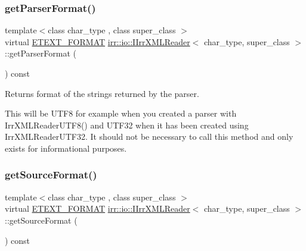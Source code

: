 \subsubsection{\texorpdfstring{get\+Parser\+Format()}{getParserFormat()}\hspace{0.1cm}{\footnotesize\ttfamily [2/2]}}
{\footnotesize\ttfamily template$<$class char\+\_\+type , class super\+\_\+class $>$ \\
virtual \hyperlink{namespaceirr_1_1io_ac7e51e5a6bd00451dec248f497b16a9d}{E\+T\+E\+X\+T\+\_\+\+F\+O\+R\+M\+AT} \hyperlink{classirr_1_1io_1_1IIrrXMLReader}{irr\+::io\+::\+I\+Irr\+X\+M\+L\+Reader}$<$ char\+\_\+type, super\+\_\+class $>$\+::get\+Parser\+Format (\begin{DoxyParamCaption}{ }\end{DoxyParamCaption}) const\hspace{0.3cm}{\ttfamily [pure virtual]}}



Returns format of the strings returned by the parser. 

This will be U\+T\+F8 for example when you created a parser with Irr\+X\+M\+L\+Reader\+U\+T\+F8() and U\+T\+F32 when it has been created using Irr\+X\+M\+L\+Reader\+U\+T\+F32. It should not be necessary to call this method and only exists for informational purposes. \mbox{\label{classirr_1_1io_1_1IIrrXMLReader_a00998ef2d3a562d6b2b8302c3430322d}} 
\subsubsection{\texorpdfstring{get\+Source\+Format()}{getSourceFormat()}\hspace{0.1cm}{\footnotesize\ttfamily [1/2]}}
{\footnotesize\ttfamily template$<$class char\+\_\+type , class super\+\_\+class $>$ \\
virtual \hyperlink{namespaceirr_1_1io_ac7e51e5a6bd00451dec248f497b16a9d}{E\+T\+E\+X\+T\+\_\+\+F\+O\+R\+M\+AT} \hyperlink{classirr_1_1io_1_1IIrrXMLReader}{irr\+::io\+::\+I\+Irr\+X\+M\+L\+Reader}$<$ char\+\_\+type, super\+\_\+class $>$\+::get\+Source\+Format (\begin{DoxyParamCaption}{ }\end{DoxyParamCaption}) const\hspace{0.3cm}{\ttfamily [pure virtual]}}



